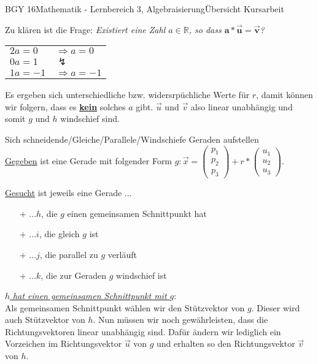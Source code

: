 \documentclass[oneside,openany,headings=optiontotoc,11pt,numbers=noenddot]{scrreprt}
\begin{document}
\begin{worksheet}{BGY 16}{Mathematik - Lernbereich 3, Algebraisierung}{Übersicht Kursarbeit}
\begin{framed}
			Zu klären ist die Frage: \textit{Existiert eine Zahl \(a\in\mathbb{R}\), so dass \(\mathbf{a*\vec{u} = \vec{v}}\)?}
			\begin{tabularx}{\textwidth}{ll}
				\(2a = 0\) & \(\Rightarrow a = 0\)\\
				\(0a = 1\) & \(\lightning\)\\
				\(1a = -1\) & \(\Rightarrow a = -1\)
			\end{tabularx}
			Es ergeben sich unterschiedliche bzw. widersrpüchliche Werte für \(r\), damit können wir folgern, dass es \underline{\textbf{kein}} solches \(a\) gibt. \(\vec{u}\) und \(\vec{v}\) also linear \color{blue}unabhängig\normalcolor{} und somit \(g\) und \(h\) \color{red}windschief\normalcolor{} sind.\\
		\end{framed}
		\begin{framed}
			\noindent
			\tiny{\color{codegray}Sich schneidende/Gleiche/Parallele/Windschiefe Geraden aufstellen}\\\normalsize
			\underline{Gegeben} ist eine Gerade mit folgender Form \(g: \vec{x} = \left(\begin{array}{c}p_1\\p_2\\p_3\end{array}\right) + r*\left(\begin{array}{c}u_1\\u_2\\u_3\end{array}\right)\).\\
			\par\noindent
			\underline{Gesucht} ist jeweils eine Gerade ...
			\begin{itemize}
				\item[+] ...\(h\), die \(g\) \color{codegreen}einen\normalcolor{} gemeinsamen Schnittpunkt hat
				\item[+] ...\(i\), die \color{codegreen}gleich\normalcolor{} \(g\) ist
				\item[+] ...\(j\), die \color{red}parallel\normalcolor{} zu \(g\) verläuft
				\item[+] ...\(k\), die zur Geraden \(g\) \color{red}windschief\normalcolor{} ist
			\end{itemize}
			\par\bigskip\noindent
			\underline{\textit{\(h\) hat \color{codegreen}einen\normalcolor{} gemeinsamen Schnittpunkt mit \(g\)}}:\\
			Als gemeinsamen Schnittpunkt wählen wir den Stützvektor von \(g\). Dieser wird auch Stützvektor von \(h\). Nun müssen wir noch gewährleisten, dass die Richtungsvektoren linear \color{blue}unabhängig\normalcolor{} sind. Dafür ändern wir lediglich ein Vorzeichen im Richtungsvektor \(\vec{u}\) von \(g\) und erhalten so den Richtungsvektor \(\vec{v}\) von \(h\).\\

\end{framed}
\end{worksheet}
\end{document}

